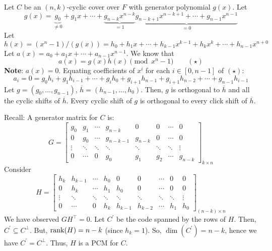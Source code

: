 Let $ C $ be an $ (n,k) $-cyclic cover over $ F $ with generator
polynomial $ g(x) $. Let
\[ g(x)=\underbrace{g_0}_{\neq 0}+g_1x+\cdots+\underbrace{g_{n-k}x^{n-k}}_{=1}
    \underbrace{g_{n-k+1}x^{n-k+1}+\cdots+g_{n-1}x^{n-1}}_{=0} \]
Let
\[ h(x)=(x^n-1)/(g(x))=h_0+h_1x+\cdots+h_{k-1}x^{k-1}+h_k x^k+\cdots+h_{n-1}x^{n+0} \]
Let $ a(x)=a_0+a_1x+\cdots+a_{n-1}x^{n-1} $. We know that
\[ a(x)=g(x)h(x)\pmod{x^n-1} \qquad (\star) \]
\textbf{Note}: $ a(x)=0 $. Equating coefficients of $ x^i $ for each $ i\in [0,n-1] $
of $ (\star) $:
\[ a_i=0=g_0h_i+g_1h_{i-1}+\cdots+g_i h_0+g_{i+1}h_{n-1}
    +g_{i+1}h_{n-2}+\cdots+g_{n-1}h_{i-1} \]
Let $ g=(g_0,\ldots ,g_{n-1}) $, $ \overline{h}=(h_{n-1},\ldots ,h_0) $.
Then, $ g $ is orthogonal to $ \overline{h} $ and all the cyclic shifts
of $ \overline{h} $. Every cyclic shift of $ g $ is orthogonal to
every click shift of $ \overline{h} $.

Recall: A generator matrix for $ C $ is:
\[ G=
    \left[
        \begin{array}{cccccccc}
            g_{0}  & g_{1}  & \cdots & g_{n-k}   & 0       & 0      & \cdots & 0       \\
            0      & g_{0}  & \cdots & g_{n-k-1} & g_{n-k} & 0      & \cdots & 0       \\
            \vdots & \ddots & \ddots & \ddots    & \ddots  & \ddots & \ddots & \vdots  \\
            0      & \cdots & 0      & g_{0}     & g_{1}   & g_{2}  & \cdots & g_{n-k}
        \end{array}
        \right]_{k \times{} n} \]
Consider
\[ H=
    \left[
        \begin{array}{ccccccccc}
            h_{k}  & h_{k-1} & \cdots & h_{0}  & 0       & 0       & \cdots & 0      & 0      \\
            0      & h_{k}   & \cdots & h_{1}  & h_{0}   & 0       & \cdots & 0      & 0      \\
            \vdots & \ddots  & \ddots & \ddots & \ddots  & \ddots  & \ddots & \ddots & \vdots \\
            0      & \cdots  & 0      & h_{k}  & h_{k-1} & h_{k-2} & \cdots & h_{1}  & h_{0}
        \end{array}
        \right]_{(n-k) \times{} n} \]
We have observed $ GH^{\top}=0 $. Let $ C^{\prime} $ be the code
spanned by the rows of $ H $. Then, $ C^{\prime}\subseteq C^{\perp} $.
But, $ \operatorname{rank}(H)=n-k $ (since $ h_k=1 $). So, $ \dim(C^\prime)=n-k $,
hence we have $ C^\prime=C^{\perp} $. Thus, $ H $ is a PCM for $ C $.

